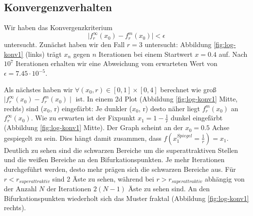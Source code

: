 \documentclass[12pt,a4paper]{article}
\begin{document}
\subsection{Konvergenzverhalten}
Wir haben das Konvergenzkriterium 
\begin{equation}
\mid f^{\infty}_r(x_0)-f^{m}_r(x_0)\mid < \epsilon
\end{equation}
untersucht. 
Zunächst haben wir den Fall $r=3$ untersucht: Abbildung \ref{fig:log-konv1} (links) trägt $x_n$ gegen $n$ Iterationen bei einem Startwert $x=0.4$ auf. Nach $10^7$ Iterationen erhalten wir eine Abweichung vom erwarteten Wert von $\epsilon=7.45 \cdot 10^{-5}$.


Als nächstes haben wir $\forall (x_0, r) \in [0,1] \times [0,4]$  berechnet wie groß $\mid f^{\infty}_r(x_0)-f^{m}_r(x_0)\mid $ ist. 
In einem 2d Plot (Abbildung \ref{fig:log-konv1} Mitte, rechts) sind ($x_0$, r) eingefärbt: Je dunkler ($x_0$, r) desto näher liegt $f^{m}_r(x_0)$ an $f^{\infty}_r(x_0)$. 
Wie zu erwarten ist der Fixpunkt $x_1=1-\frac{1}{r}$ dunkel eingefärbt (Abbildung \ref{fig:log-konv1} Mitte). Der Graph scheint an der $x_0=0.5$ Achse gespiegelt zu sein. Dies hängt damit zusammen, dass $f(x^{Spiegel}_{1}=\frac{1}{r}) = x_1$. 
Deutlich zu sehen sind die schwarzen Bereiche um die superattraktiven Stellen und die weißen Bereiche an den Bifurkationspunkten. Je mehr Iterationen durchgeführt werden, desto mehr prägen sich die schwarzen Bereiche aus. Für $r < r_{superattraktiv}$ sind 2 Äste zu sehen, während bei $r > r_{superattraktiv}$ abhängig von der Anzahl $N$ der Iterationen $2(N-1)$ Äste zu sehen sind. An den Bifurkationspunkten wiederholt sich das Muster fraktal (Abbildung \ref{fig:log-konv1} rechts). 
\end{document}
